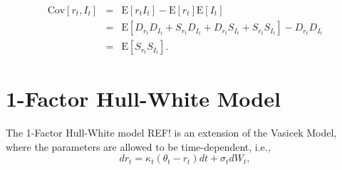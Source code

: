 \documentclass{report}
\newcommand{\E}{\mathrm{E}}
\newcommand{\Cov}{\mathrm{Cov}}
\begin{document}
\begin{eqnarray}
\Cov \left[ r_t, I_t \right] &=& \E \left[ r_t I_t \right] - \E \left[ r_t \right] \E \left[ I_t \right] \\
&=& \E \left[ D_{r_t} D_{I_t} + S_{r_t} D_{I_t} + D_{r_t} S_{I_t} + S_{r_t} S_{I_t} \right] - D_{r_t} D_{I_t} \\
&=& \E \left[ S_{r_t} S_{I_t} \right].
\end{eqnarray}



\section{1-Factor Hull-White Model}
The 1-Factor Hull-White model REF! is an extension of the Vasicek Model, where the parameters are allowed to be time-dependent, i.e.,
\begin{equation}
dr_t = \kappa_t \left( \theta_t - r_t \right) dt + \sigma_t dW_t,
\end{equation}



 
\end{document}
